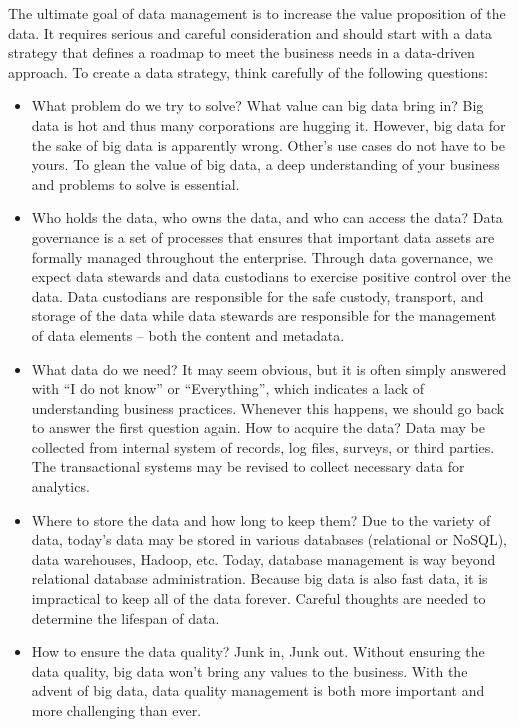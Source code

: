 \documentclass[11pt]{book}
\begin{document}
The ultimate goal of data management is to increase the value proposition of the data. It requires serious and careful consideration and should start with a data strategy that defines a roadmap to meet the business needs in a data-driven approach. To create a data strategy, think carefully of the following questions:
\begin{itemize}
\item What problem do we try to solve? What value can big data bring in? Big data is hot and thus many corporations are hugging it. However, big data for the sake of big data is apparently wrong. Other's use cases do not have to be yours. To glean the value of big data, a deep understanding of your business and problems to solve is essential.
\item Who holds the data, who owns the data, and who can access the data? Data governance is a set of processes that ensures that important data assets are formally managed throughout the enterprise. Through data governance, we expect data stewards and data custodians to exercise positive control over the data. Data custodians are responsible for the safe custody, transport, and storage of the data while data stewards are responsible for the management of data elements -- both the content and metadata.
\item What data do we need? It may seem obvious, but it is often simply answered with ``I do not know'' or ``Everything'', which indicates a lack of understanding business practices. Whenever this happens, we should go back to answer the first question again. How to acquire the data? Data may be collected from internal system of records, log files, surveys, or third parties. The transactional systems may be revised to collect necessary data for analytics.
\item Where to store the data and how long to keep them? Due to the variety of data, today's data may be stored in various databases (relational or NoSQL), data warehouses, Hadoop, etc. Today, database management is way beyond relational database administration. Because big data is also fast data, it is impractical to keep all of the data forever. Careful thoughts are needed to determine the lifespan of data.
\item How to ensure the data quality? Junk in, Junk out. Without ensuring the data quality, big data won't bring any values to the business. With the advent of big data, data quality management is both more important and more challenging than ever. 

\end{itemize}
\end{document}
